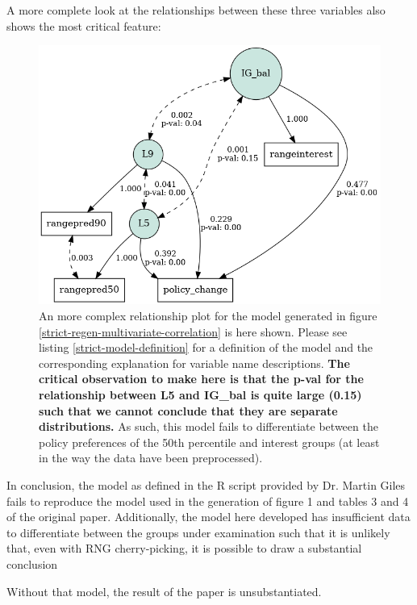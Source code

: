 \documentclass[]{article}
\begin{document}
A more complete look at the relationships between these three variables also shows the most critical feature:
\begin{figure}[H]
	\begin{center}
		\includegraphics[width=\linewidth]{./figures/generated/multivariate-analysis/strict-regen-multivariate-correlation-full.png}
	\end{center}
	\caption{An more complex relationship plot for the model generated in figure \ref{strict-regen-multivariate-correlation} is here shown. Please see listing \ref{strict-model-definition} for a definition of the model and the corresponding explanation for variable name descriptions. \textbf{The critical observation to make here is that the p-val for the relationship between L5 and IG\_bal is quite large (0.15) such that we cannot conclude that they are separate distributions.} As such, this model fails to differentiate between the policy preferences of the 50th percentile and interest groups (at least in the way the data have been preprocessed).}
	\label{strict-regen-multivariate-correlation-full}
\end{figure}

In conclusion, the model as defined in the R script provided by Dr. Martin Giles fails to reproduce the model used in the generation of figure 1 and tables 3 and 4 of the original paper. Additionally, the model here developed has insufficient data to differentiate between the groups under examination such that it is unlikely that, even with RNG cherry-picking, it is possible to draw a substantial conclusion

Without that model, the result of the paper is unsubstantiated.
\end{document}
